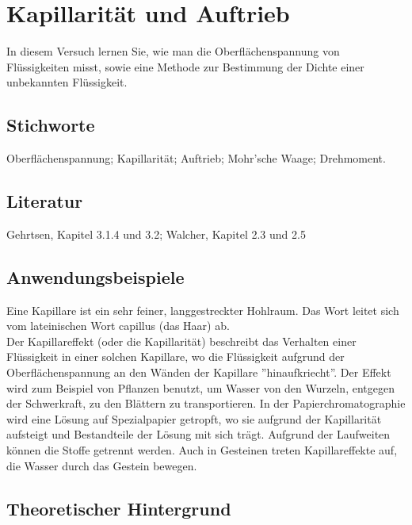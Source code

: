 \chapter{Kapillarität und Auftrieb}
\label{v:3}

In diesem Versuch lernen Sie, wie man die Oberflächenspannung von Flüssigkeiten misst, sowie eine Methode zur Bestimmung der Dichte einer unbekannten Flüssigkeit.

\section{Stichworte}
Oberflächenspannung; Kapillarität; Auftrieb; Mohr'sche Waage; Drehmoment.
%
\section{Literatur}
Gehrtsen, Kapitel 3.1.4 und 3.2; Walcher, Kapitel 2.3 und 2.5
%
\section{Anwendungsbeispiele}
%
Eine Kapillare ist ein sehr feiner, langgestreckter Hohlraum. Das Wort leitet sich vom lateinischen Wort capillus (das Haar) ab.\\
Der Kapillareffekt (oder die Kapillarität) beschreibt das Verhalten einer Flüssigkeit in einer solchen Kapillare, wo die Flüssigkeit aufgrund der Oberflächenspannung an den Wänden der Kapillare ''hinaufkriecht''. Der Effekt wird zum Beispiel von Pflanzen benutzt, um Wasser von den Wurzeln, entgegen der Schwerkraft, zu den Blättern zu transportieren. In der Papierchromatographie wird eine Lösung auf Spezialpapier getropft, wo sie aufgrund der Kapillarität aufsteigt und Bestandteile der Lösung mit sich trägt. Aufgrund der Laufweiten können die Stoffe getrennt werden. Auch in Gesteinen treten Kapillareffekte auf, die Wasser durch das Gestein bewegen.
%
\section{Theoretischer Hintergrund}

